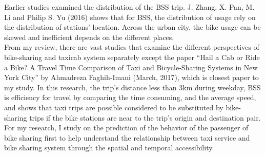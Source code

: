\documentclass{article}
\begin{document}
    Earlier studies examined the distribution of the BSS trip. J. Zhang, X. Pan, M. Li and Philip S. Yu (2016)\citep{zhang2016bicycle} shows that for BSS, the distribution of usage rely on the distribution of stations’ location. Across the urban city, the bike usage can be skewed and inefficient depends on the different places.\\
    From my review, there are vast studies that examine the different perspectives of bike-sharing and taxicab system separately except the paper “Hail a Cab or Ride a Bike? A Travel Time Comparison of Taxi and Bicycle-Sharing Systems in New York City” by Ahmadreza Faghih-Imani (March, 2017)\citep{faghih2017hail}, which is closest paper to my study. In this research, the trip’s distance less than 3km during weekday, BSS is efficiency for travel by comparing the time consuming, and the average speed, and shows that taxi trips are possible considered to be substituted by bike-sharing trips if the bike stations are near to the trip’s origin and destination pair. \\
    For my research, I study on the prediction of the behavior of the passenger of bike sharing first to help understand the relationship between taxi service and bike sharing system through the spatial and temporal accessibility.


\pagebreak{}


\end{document}
